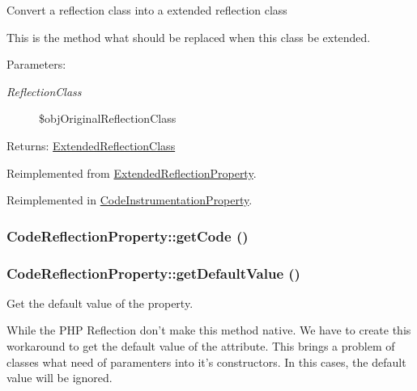Convert a reflection class into a extended reflection class

This is the method what should be replaced when this class be extended.

\begin{Desc}
\item[Parameters:]
\begin{description}
\item[{\em ReflectionClass}]\$objOriginalReflectionClass \end{description}
\end{Desc}
\begin{Desc}
\item[Returns:]\hyperlink{class_extended_reflection_class}{ExtendedReflectionClass} \end{Desc}


Reimplemented from \hyperlink{class_extended_reflection_property_05c178f6fef194d390db8312f9595d93}{ExtendedReflectionProperty}.

Reimplemented in \hyperlink{class_code_instrumentation_property_192bcd477b39d69274c9a7db05cc606d}{CodeInstrumentationProperty}.\hypertarget{class_code_reflection_property_cb9c0d02fbb50cfe8d8b023b5b07a25c}{
\subsubsection[{getCode}]{\setlength{\rightskip}{0pt plus 5cm}CodeReflectionProperty::getCode ()}}
\label{class_code_reflection_property_cb9c0d02fbb50cfe8d8b023b5b07a25c}


\hypertarget{class_code_reflection_property_6f0cc1d1c9d11ca1494665d52b8322d0}{
\subsubsection[{getDefaultValue}]{\setlength{\rightskip}{0pt plus 5cm}CodeReflectionProperty::getDefaultValue ()}}
\label{class_code_reflection_property_6f0cc1d1c9d11ca1494665d52b8322d0}


Get the default value of the property.

While the PHP Reflection don't make this method native. We have to create this workaround to get the default value of the attribute. This brings a problem of classes what need of paramenters into it's constructors. In this cases, the default value will be ignored.

